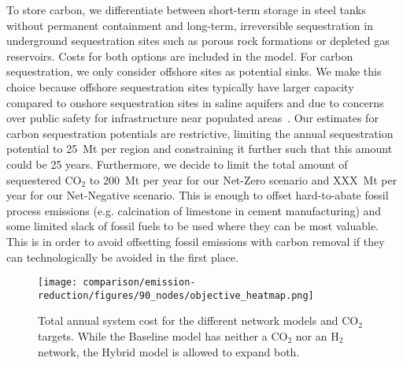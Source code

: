 \documentclass[twocolumn]{article}
\newcommand{\COtwo}{CO$_2$}
\newcommand{\Htwo}{H$_2$}
\newcommand{\modBase}{Baseline model}
\newcommand{\modHybrid}{Hybrid model}
\begin{document}

To store carbon, we differentiate between short-term storage in steel tanks without permanent containment and long-term, irreversible sequestration in underground sequestration sites such as porous rock formations or depleted gas reservoirs.
Costs for both options are included in the model.
For carbon sequestration, we only consider offshore sites as potential sinks.
We make this choice because offshore sequestration sites typically have larger capacity compared to onshore sequestration sites in saline aquifers and due to concerns over public safety for infrastructure near populated areas~\cite{TODO}.
Our estimates for carbon sequestration potentials are restrictive, limiting the annual sequestration potential to 25~Mt per region and constraining it further such that this amount could be  25 years.
Furthermore, we decide to limit the total amount of sequestered \COtwo{} to 200~Mt per year for our Net-Zero scenario and XXX~Mt per year for our Net-Negative scenario.
This is enough to offset hard-to-abate fossil process emissions (e.g. calcination of limestone in cement manufacturing) and some limited slack of fossil fuels to be used where they can be most valuable.
This is in order to avoid offsetting fossil emissions with carbon removal if they can technologically be avoided in the first place.


\printbibliography

\appendix




\begin{figure}
    \centering
    \texttt{[image: comparison/emission-reduction/figures/90\_nodes/objective\_heatmap.png]}
    \caption{Total annual system cost for the different network models and \COtwo{} targets. While the \modBase{} has neither a \COtwo{} nor an \Htwo{} network, the \modHybrid{} is allowed to expand both.}
    \label{fig:objective_heatmap}
\end{figure}
\end{document}
